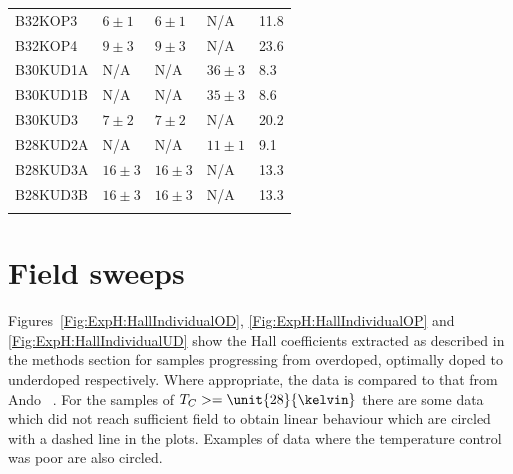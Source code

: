 \begin{table}
\begin{center}
\begin{tabular}[htbp]{lllll}
B32KOP3 	& $6\pm1$ 	& $6\pm1$ 	& N/A		& 11.8	\\
B32KOP4 	& $9\pm3$ 	& $9\pm3$ 	& N/A		& 23.6	\\
B30KUD1A	& N/A		& N/A		& $36\pm3$ 	& 8.3	\\
B30KUD1B	& N/A		& N/A		& $35\pm3$ 	& 8.6	\\
\cellcolor[gray]{0.9}B30KUD3 	& \cellcolor[gray]{0.9}$7\pm2$ 	& \cellcolor[gray]{0.9}$7\pm2$ 	& \cellcolor[gray]{0.9}N/A		& \cellcolor[gray]{0.9}20.2	\\
B28KUD2A	& N/A		& N/A		& $11\pm1$ 	& 9.1	\\
\cellcolor[gray]{0.9}B28KUD3A	& \cellcolor[gray]{0.9}$16\pm3$	& \cellcolor[gray]{0.9}$16\pm3$	& \cellcolor[gray]{0.9}N/A		& \cellcolor[gray]{0.9}13.3	\\
B28KUD3B	& $16\pm3$	& $16\pm3$	& N/A		& 13.3	\\
\bottomrule
        \label{Table:ExpH:Thicknesses}
        \end{tabular}
    \end{center}
\end{table}

\section{Field sweeps}

Figures~\ref{Fig:ExpH:HallIndividualOD}, \ref{Fig:ExpH:HallIndividualOP} and \ref{Fig:ExpH:HallIndividualUD} show the Hall coefficients extracted as described in the methods section for samples progressing from overdoped, optimally doped to underdoped respectively. Where appropriate, the data is compared to that from Ando \etal~\cite{Ando1999}. For the samples of $T_C >= \unit{28}{\kelvin}$ there are some data which did not reach sufficient field to obtain linear behaviour which are circled with a dashed line in the plots. Examples of data where the temperature control was poor are also circled.

